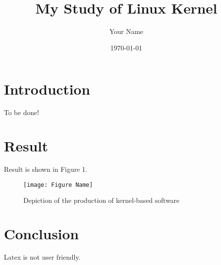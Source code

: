 \documentclass{article}
\begin{document}
\title{My Study of Linux Kernel}
\author{Your Name}
\date{\today}
\maketitle
\section{Introduction}
To be done!
\section{Result}
Result is shown in Figure 1.
\begin{figure}[h!]
	\centering	
	\texttt{[image: Figure Name]}
	\caption{Depiction of the production of kernel-based software}	
\end{figure}
\section{Conclusion}
Latex is not user friendly.
\end{document}
